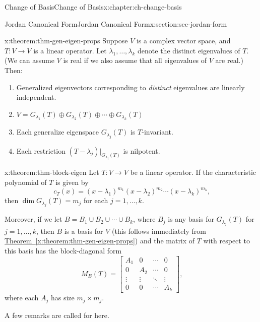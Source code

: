 \documentclass[oneside,10pt,]{book}
\newcommand{\xreffont}{\relax}
\numberwithin{equation}{section}
\newcommand{\bbm}{\begin{bmatrix}}
\newcommand{\ebm}{\end{bmatrix}}
\newcommand{\amp}{&}
\begin{document}
\begin{chapterptx}{Change of Basis}{}{Change of Basis}{}{}{x:chapter:ch-change-basis}
\begin{sectionptx}{Jordan Canonical Form}{}{Jordan Canonical Form}{}{}{x:section:sec-jordan-form}
\begin{theorem}{}{}{x:theorem:thm-gen-eigen-props}%
Suppose \(V\) is a complex vector space, and \(T:V\to V\) is a linear operator. Let \(\lambda_1,\ldots, \lambda_k\) denote the distinct eigenvalues of \(T\). (We can assume \(V\) is real if we also assume that all eigenvalues of \(V\) are real.) Then:%
\begin{enumerate}
\item{}Generalized eigenvectors corresponding to \emph{distinct} eigenvalues are linearly independent.%
\item{}\(\displaystyle V = G_{\lambda_1}(T)\oplus G_{\lambda_2}(T)\oplus \cdots \oplus G_{\lambda_k}(T)\)%
\item{}Each generalize eigenspace \(G_{\lambda_j}(T)\) is \(T\)-invariant.%
\item{}Each restriction \((T-\lambda_j)|_{G_{\lambda_j}(T)}\) is nilpotent.%
\end{enumerate}
%
\end{theorem}
\begin{theorem}{}{}{x:theorem:thm-block-eigen}%
Let \(T:V\to V\) be a linear operator. If the characteristic polynomial of \(T\) is given by%
\begin{equation*}
c_T(x) = (x-\lambda_1)^{m_1}(x-\lambda_2)^{m_2}\cdots (x-\lambda_k)^{m_k}\text{,}
\end{equation*}
then \(\dim G_{\lambda_j}(T)=m_j\) for each \(j=1,\ldots, k\).%
\par
Moreover, if we let \(B=B_1\cup B_2\cup\cdots \cup B_k\), where \(B_j\) is any basis for \(G_{\lambda_j}(T)\) for \(j=1,\ldots, k\), then \(B\) is a basis for \(V\) (this follows immediately from \hyperref[x:theorem:thm-gen-eigen-props]{Theorem~{\xreffont\ref{x:theorem:thm-gen-eigen-props}}}) and the matrix of \(T\) with respect to this basis has the block-diagonal form%
\begin{equation*}
M_B(T) = \bbm A_1 \amp 0 \amp \cdots \amp 0\\
0 \amp A_2 \amp \cdots \amp 0\\
\vdots\amp\vdots\amp\ddots\amp\vdots\\
0 \amp 0 \amp \cdots \amp A_k\ebm\text{,}
\end{equation*}
where each \(A_j\) has size \(m_j\times m_j\).%
\end{theorem}
A few remarks are called for here.%
\begin{itemize}[label=\textbullet]

\end{itemize}
\end{sectionptx}
\end{chapterptx}
\end{document}
